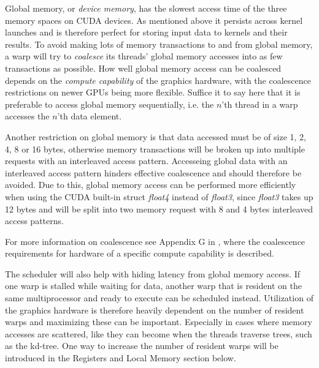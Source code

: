 

Global memory, or \textit{device memory}, has the slowest access time of the
three memory spaces on CUDA devices. As mentioned above it persists across
kernel launches and is therefore perfect for storing input data to kernels and
their results. To avoid making lots of memory transactions to and from global
memory, a warp will try to \textit{coalesce} its threads' global memory accesses
into as few transactions as possible. How well global memory access can be
coalesced depends on the \textit{compute capability} of the graphics hardware,
with the coalescence restrictions on newer GPUs being more flexible. Suffice it
to say here that it is preferable to access global memory sequentially, i.e. the
$n$'th thread in a warp accesses the $n$'th data element.


Another restriction on global memory is that data accessed must be of size 1, 2,
4, 8 or 16 bytes, otherwise memory transactions will be broken up into multiple
requests with an interleaved access pattern. Accesseing global data with an
interleaved access pattern hinders effective coalescence and should therefore
be avoided. Due to this, global memory access can be performed more efficiently
when using the CUDA built-in struct \textit{float4} instead of \textit{float3},
since \textit{float3} takes up 12 bytes and will be split into two memory
request with 8 and 4 bytes interleaved access patterns.

For more information on coalescence see Appendix G in , where
the coalescence requirements for hardware of a specific compute capability is
described.


The scheduler will also help with hiding latency from global memory access. If
one warp is stalled while waiting for data, another warp that is resident on the
same multiprocessor and ready to execute can be scheduled instead. Utilization
of the graphics hardware is therefore heavily dependent on the number of
resident warps and maximizing these can be important. Especially in cases where
memory accesses are scattered, like they can become when the threads traverse
trees, such as the kd-tree. One way to increase the number of resident warps
will be introduced in the Registers and Local Memory section below.

